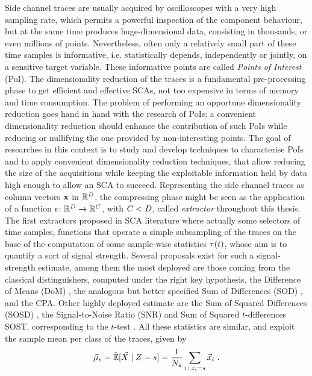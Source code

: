 Side channel traces are usually acquired by oscilloscopes with a very high sampling rate, which permits a powerful inspection of the component behaviour, but at the same time produces huge-dimensional data, consisting in thousands, or even millions of points. Nevertheless, often only a relatively small part of these time samples is informative, i.e. statistically depends, independently or jointly, on a sensitive target variable. These informative points are called \emph{Points of Interest} (PoI). The dimensionality reduction of the traces is a fundamental pre-processing phase to get efficient and effective SCAs, not too expensive in terms of memory and time consumption. The problem of performing an opportune dimensionality reduction goes hand in hand with the research of PoIs: a convenient dimensionality reduction should enhance the contribution of such PoIs while reducing or nullifying the one provided by non-interesting points. 
The goal of researches in this context is to study and develop techniques to characterise PoIs and to apply convenient dimensionality reduction techniques, that allow reducing the size of the acquisitions while keeping the exploitable information held by data high enough to allow an SCA to succeed.
Representing the side channel traces as column vectors ${\bf x}$ in $\mathbb{R}^D$, the compressing phase might be seen as the application of a function $\epsilon\colon \mathbb{R}^D\rightarrow \mathbb{R}^C$, with $C<D$, called {\em extractor} throughout this thesis. The first extractors proposed in SCA literature where actually some selectors of time samples, \ie functions that operate a simple subsampling of the traces on the base of the computation of some sample-wise statistics $\tau(t)$, whose aim is to quantify a sort of  signal strength. Several proposals exist for such a signal-strength estimate, among them the most deployed are those coming from the classical distinguishers, computed under the right key hypothesis, \eg the Difference of Means (DoM) \cite{Chari2003}, the analogous but better specified Sum of Differences (SOD) \cite{Rechberger2005}, and the CPA. Other highly deployed estimate are the Sum of Squared Differences (SOSD) \cite{gierlichs2006templates}, the Signal-to-Noise Ratio (SNR) \cite{mangard2008power,lomne2013behind} and  Sum of Squared $t$-differences SOST, corresponding to the $t$-test \cite{gierlichs2006templates}. All these statistics are similar, and exploit the sample mean per class of the traces, given by
\begin{equation}\label{eq:mmmXclass}
\mmmXclass= \esperEst[\given{\vaLeakVec}{\sensRandVar = \sensVarGenValue}] = \frac{1}{\nbTracesPerClass}\sum_{i\colon \sensVar_i=\sensVarGenValue} \vLeakVec_i  \mbox{ .}
\end{equation} 
